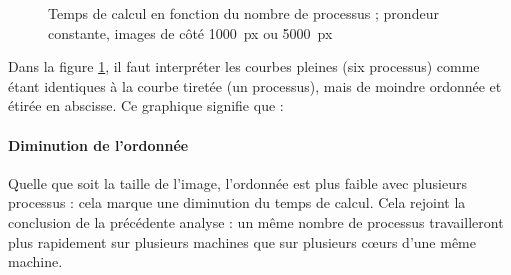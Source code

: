 \begin{figure}
  \centering


  \caption{Temps de calcul en fonction du nombre de processus ;
    prondeur constante, images de côté 1000~px ou 5000~px}
  \label{fig:mandel:stat:six-nproc}
\end{figure}

Dans la figure \ref{fig:mandel:stat:six-nproc}, il faut interpréter
les courbes pleines (six processus) comme étant identiques à la courbe
tiretée (un processus), mais de moindre ordonnée et étirée en
abscisse. Ce graphique signifie que :

\paragraph{Diminution de l'ordonnée}
Quelle que soit la taille de l'image, l'ordonnée est plus faible avec
plusieurs processus : cela marque une diminution du temps de
calcul. Cela rejoint la conclusion de la précédente analyse : un même
nombre de processus travailleront plus rapidement sur plusieurs
machines que sur plusieurs cœurs d'une même machine.

